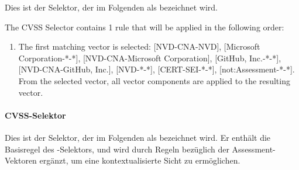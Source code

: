 Dies ist der Selektor, der im Folgenden als  bezeichnet wird.

\noindent The CVSS Selector contains 1 rule that will be applied in the following order:
\begin{enumerate}[noitemsep]
    \item The first matching vector is selected: [NVD-CNA-NVD], [Microsoft Corporation-*-*], [NVD-CNA-Microsoft Corporation], [GitHub, Inc.-*-*], [NVD-CNA-GitHub, Inc.], [NVD-*-*], [CERT-SEI-*-*], [not:Assessment-*-*]. From the selected vector, all vector components are applied to the resulting vector.
\end{enumerate}

\paragraph{CVSS-Selektor } \label{par:projektbericht-loesungsweg-cvss-selection-example-selector-context}

Dies ist der Selektor, der im Folgenden als  bezeichnet wird.
Er enthält die Basisregel des -Selektors, und wird durch Regeln bezüglich der Assessment-Vektoren ergänzt, um eine kontextualisierte Sicht zu ermöglichen.

